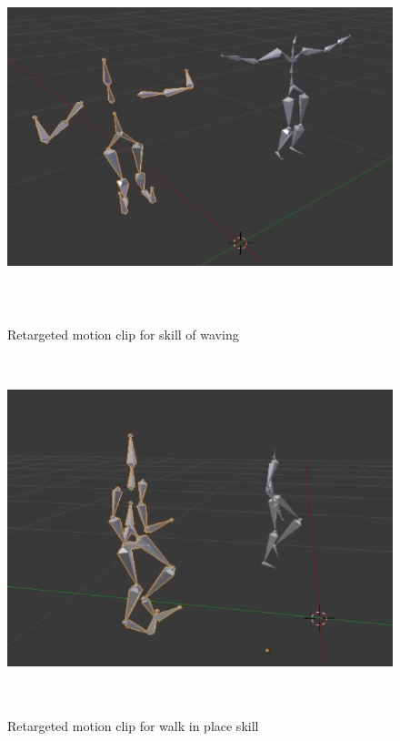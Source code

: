 \begin{figure}[!b]
  \centering
  \href{https://youtu.be/UpT7YPi6Ekc}{\includegraphics[width=1\linewidth, height=10cm]{images/retarget_wave.png}}
  \caption{Retargeted motion clip for skill of waving}
  \label{fig:retarget_wave}
\end{figure}
\begin{figure} 
  \centering
  \href{https://youtu.be/wdyNuvNhy3o}{\includegraphics[width=1\linewidth, height=10cm]{images/retarget_wip.png}}
  \caption{Retargeted motion clip for walk in place skill}
  \label{fig:retarget_wip}
\end{figure}
